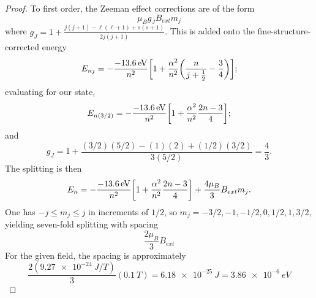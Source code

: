 \documentclass{article}
\begin{document}
\begin{proof}
  To first order, the Zeeman effect corrections are of the form
  \[
    \mu_{B}g_{J}B_{ext}m_{j}
  \]
  where $g_{J} = 1 + \frac{j(j+1) - \ell(\ell + 1) + s(s + 1)}{2j(j + 1)}$.
  This is added onto the fine-structure-corrected energy
  \[
    E_{nj} = -\frac{\SI{-13.6}{eV}}{n^{2}}\qty[1 + \frac{\alpha^{2}}{n^{2}}\qty(\frac{n}{j + \frac{1}{2}} - \frac{3}{4})];
  \]
  evaluating for our state,
  \[
    E_{n(3/2)} = -\frac{\SI{-13.6}{eV}}{n^{2}}\qty[1 + \frac{\alpha^{2}}{n^{2}}\frac{2n - 3}{4}];
  \]
  and
  \[
    g_{J} = 1 + \frac{(3/2)(5/2) - (1)(2) + (1/2)(3/2)}{3(5/2)} = \frac{4}{3}.
  \]
  The splitting is then
  \[
    E_{n} = -\frac{\SI{-13.6}{eV}}{n^{2}}\qty[1 + \frac{\alpha^{2}}{n^{2}}\frac{2n - 3}{4}] + \frac{4\mu_{B}}{3}B_{ext}m_{j}.
  \]
  One has $-j \leq m_{j} \leq j$ in increments of $1/2$, so $m_{j} = -3/2, -1, -1/2, 0, 1/2, 1, 3/2$, yielding seven-fold splitting with spacing
  \[
    \frac{2\mu_{B}}{3}B_{ext}
  \]
  For the given field, the spacing is approximately
  \[
    \frac{2(\SI{9.27e-24}{J/T})}{3}(\SI{0.1}{T}) = \SI{6.18e-25}{J} = \SI{3.86e-6}{eV}
  \]
\end{proof}
\end{document}
